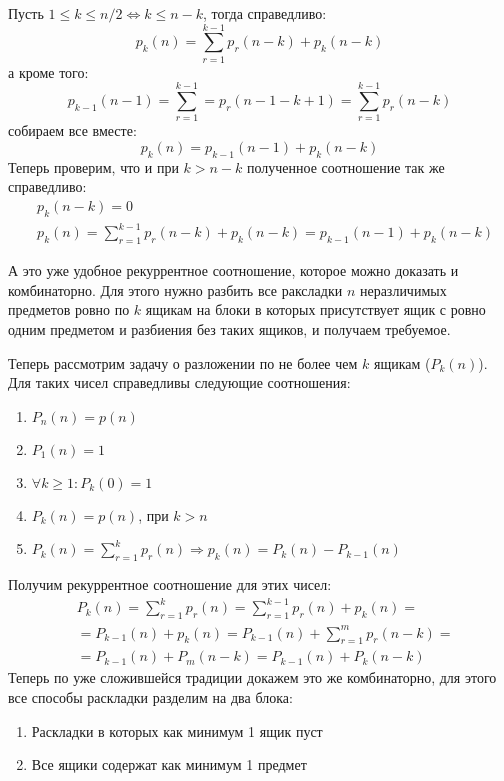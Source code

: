 Пусть $1 \le k \le n/2 \Leftrightarrow k \le n-k$, тогда справедливо:
\[
	p_k\left(n\right) = \sum_{r=1}^{k-1} p_r\left(n-k\right) + p_k\left(n-k\right)
\]
а кроме того:
\[
	p_{k-1}\left(n-1\right) = \sum_{r=1}^{k-1} = p_r\left(n-1-k+1\right) = \sum_{r=1}^{k-1} p_r\left(n-k\right)
\]
собираем все вместе:
\[
	p_k\left(n\right) = p_{k-1}\left(n-1\right) + p_k\left(n-k\right)
\]
Теперь проверим, что и при $k>n-k$ полученное соотношение так же справедливо:
\[
	\begin{split}
		& p_k\left(n-k\right) = 0 \\
		& p_k\left(n\right) = \sum_{r=1}^{k-1} p_r\left(n-k\right) + p_k\left(n-k\right) = p_{k-1}\left(n-1\right) + p_k\left(n-k\right)
	\end{split}
\]

А это уже удобное рекуррентное соотношение, которое можно доказать и комбинаторно. Для этого нужно разбить все раксладки $n$ неразличимых предметов ровно по $k$ ящикам на блоки в которых присутствует ящик с ровно одним предметом и разбиения без таких ящиков, и получаем требуемое.

Теперь рассмотрим задачу о разложении по не более чем $k$ ящикам ($P_k\left(n\right)$). Для таких чисел справедливы следующие соотношения:
\begin{enumerate}
\item $P_n\left(n\right) = p\left(n\right)$

\item $P_1\left(n\right) = 1$

\item $\forall k \ge 1 : P_k\left(0\right) = 1$

\item $P_k\left(n\right) = p\left(n\right)$, при $k>n$

\item $P_k\left(n\right) = \sum_{r=1}^k p_r\left(n\right) \Rightarrow p_k\left(n\right) = P_k\left(n\right) - P_{k-1}\left(n\right)$
\end{enumerate}

Получим рекуррентное соотношение для этих чисел:
\[
	\begin{split}
		&P_k\left(n\right) = \sum_{r=1}^k p_r\left(n\right) = \sum_{r=1}^{k-1} p_r\left(n\right) + p_k\left(n\right) = \\
		& = P_{k-1}\left(n\right) + p_k\left(n\right) = P_{k-1}\left(n\right) + \sum_{r=1}^m p_r\left(n-k\right) = \\
		& = P_{k-1}\left(n\right) + P_m\left(n-k\right) = P_{k-1}\left(n\right) + P_k\left(n-k\right)
	\end{split}
\]
Теперь по уже сложившейся традиции докажем это же комбинаторно, для этого все способы раскладки разделим на два блока:
\begin{enumerate}
\item Раскладки в которых как минимум 1 ящик пуст

\item Все ящики содержат как минимум 1 предмет
\end{enumerate}

